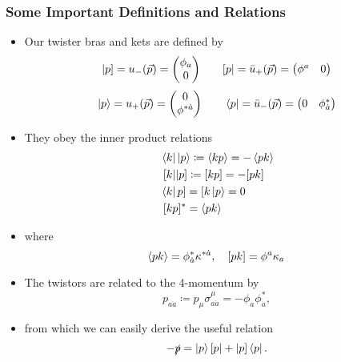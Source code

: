 \documentclass{beamer}
\begin{document}
\begin{frame}
\frametitle{Some Important Definitions and Relations}
\begin{itemize}
    \item<only@1> Our twister bras and kets are defined by
    \[ |p] = u_-(\vec{p}) = \mqty(\phi_a \\ 0) \qquad [p| = \bar{u}_+(\vec{p}) = \mqty(\phi^a & 0) \]
    \[ \ket{p} = u_+(\vec{p}) = \mqty(0 \\ \phi^{*\dot{a}}) \qquad \bra{p} = \bar{u}_-(\vec{p}) = \mqty(0 & \phi_{\dot{a}}^*) \]

    \item<only@2> They obey the inner product relations
    \begin{align*}
        & \bra{k}{}\ket{p} \coloneqq \ev{kp} = -\ev{pk} \\
        &\; [k||p] \coloneqq [kp] = -[pk] \\
        & \bra{k}p] = [k\ket{p} = 0 \\
        &\; [kp]^* = \ev{pk}
    \end{align*}
    \item<only@2> where
    \[ \ev{pk} = \phi_{\dot{a}}^*\kappa^{*\dot{a}}, \quad [pk] = \phi^a\kappa_a \]

    \item<only@3> The twistors are related to the 4-momentum by
    \[ p_{a\dot{a}} \coloneqq p_\mu\sigma_{a\dot{a}}^\mu = -\phi_a\phi_{\dot{a}}^*, \]
    \item<only@3> from which we can easily derive the useful relation
    \[ -\slashed{p} = \ket{p}[p| + |p]\bra{p}. \]
\end{itemize}
\end{frame}
\end{document}
